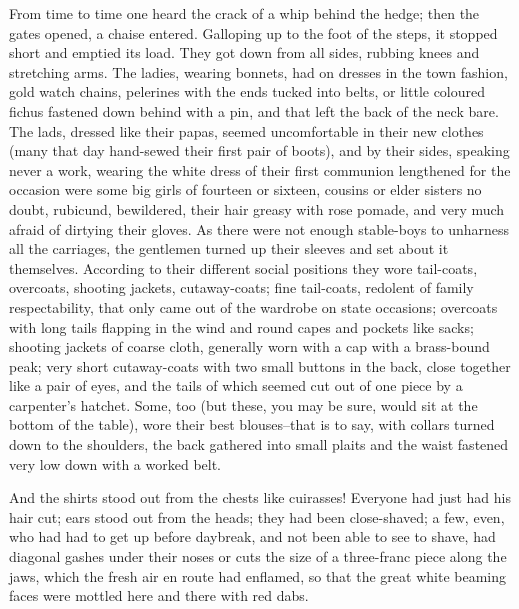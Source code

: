 \documentclass{tufte-book}
\begin{document}
From time to time one heard the crack of a whip behind the hedge; then
the gates opened, a chaise entered. Galloping up to the foot of the
steps, it stopped short and emptied its load. They got down from all
sides, rubbing knees and stretching arms. The ladies, wearing bonnets,
had on dresses in the town fashion, gold watch chains, pelerines with
the ends tucked into belts, or little coloured fichus fastened down
behind with a pin, and that left the back of the neck bare. The lads,
dressed like their papas, seemed uncomfortable in their new clothes
(many that day hand-sewed their first pair of boots), and by their
sides, speaking never a work, wearing the white dress of their first
communion lengthened for the occasion were some big girls of fourteen or
sixteen, cousins or elder sisters no doubt, rubicund, bewildered, their
hair greasy with rose pomade, and very much afraid of dirtying their
gloves. As there were not enough stable-boys to unharness all the
carriages, the gentlemen turned up their sleeves and set about it
themselves. According to their different social positions they wore
tail-coats, overcoats, shooting jackets, cutaway-coats; fine tail-coats,
redolent of family respectability, that only came out of the wardrobe
on state occasions; overcoats with long tails flapping in the wind and
round capes and pockets like sacks; shooting jackets of coarse
cloth, generally worn with a cap with a brass-bound peak; very short
cutaway-coats with two small buttons in the back, close together like
a pair of eyes, and the tails of which seemed cut out of one piece by a
carpenter's hatchet. Some, too (but these, you may be sure, would sit at
the bottom of the table), wore their best blouses--that is to say,
with collars turned down to the shoulders, the back gathered into small
plaits and the waist fastened very low down with a worked belt.

And the shirts stood out from the chests like cuirasses! Everyone had
just had his hair cut; ears stood out from the heads; they had been
close-shaved; a few, even, who had had to get up before daybreak, and
not been able to see to shave, had diagonal gashes under their noses or
cuts the size of a three-franc piece along the jaws, which the fresh
air en route had enflamed, so that the great white beaming faces were
mottled here and there with red dabs.
\end{document}
